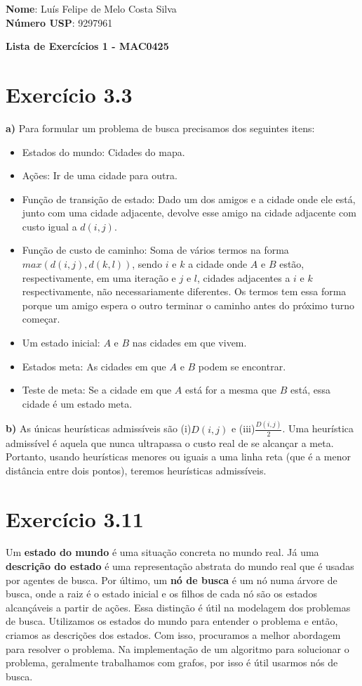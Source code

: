 \documentclass[12pt,letterpaper]{article}
\begin{document}
	
	\large \textbf{Nome}: Luís Felipe de Melo Costa Silva \\
	\textbf{Número USP}: 9297961 
    
	\begin{center}
		\LARGE \bf
		Lista de Exercícios 1 - MAC0425
	\end{center}
	
	\section*{Exercício 3.3}
	
	\textbf{a)} Para formular um problema de busca precisamos dos seguintes itens:
	
	\begin{itemize}
		\item Estados do mundo: Cidades do mapa.
		\item Ações: Ir de uma cidade para outra.
		\item Função de transição de estado: Dado um dos amigos e a cidade onde ele está, junto com uma cidade adjacente, devolve esse amigo na cidade adjacente com custo igual a $d(i,j)$.
		\item Função de custo de caminho:
		Soma de vários termos na forma\\ $max(d(i,j), d(k,l))$, sendo $i$ e $k$ a cidade onde $A$ e $B$ estão, respectivamente, em uma iteração e $j$ e $l$, cidades adjacentes a $i$ e $k$ respectivamente, não necessariamente diferentes. Os termos tem essa forma porque um amigo espera o outro terminar o caminho antes do próximo turno começar.
		\item Um estado inicial: $A$ e $B$ nas cidades em que vivem. 
		\item Estados meta: As cidades em que $A$ e $B$ podem se encontrar.
		\item Teste de meta: Se a cidade em que $A$ está for a mesma que $B$ está, essa cidade é um estado meta.
	\end{itemize}
		
	\textbf{b)} As únicas heurísticas admissíveis são (i)$D(i,j)$ e (iii)$\frac{D(i,j)}{2}$. Uma heurística admissível é aquela que nunca ultrapassa o custo real de se alcançar a meta. Portanto, usando heurísticas menores ou iguais a uma linha reta (que é a menor distância entre dois pontos), teremos heurísticas admissíveis. 

	\section*{Exercício 3.11}
	Um \textbf{estado do mundo} é uma situação concreta no mundo real. Já uma \textbf{descrição do estado} é uma representação abstrata do mundo real que é usadas por agentes de busca. Por último, um \textbf{nó de busca} é um nó numa árvore de busca, onde a raiz é o estado inicial e os filhos de cada nó são os estados alcançáveis a partir de ações. Essa distinção é útil na modelagem dos problemas de busca. Utilizamos os estados do mundo para entender o problema e então, criamos as descrições dos estados. Com isso, procuramos a melhor abordagem para resolver o problema. Na implementação de um algoritmo para solucionar o problema, geralmente trabalhamos com grafos, por isso é útil usarmos nós de busca.
\end{document}
